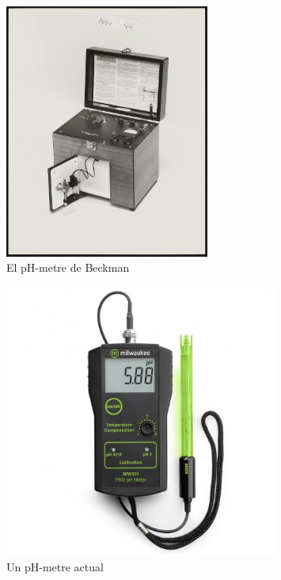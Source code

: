 \begin{minipage}[h]{0.5\textwidth}
  \begin{figure}[H]
  \centering
  \includegraphics[width=0.6\textwidth]{./Figures/modelbeckman.png}
  \caption{El pH-metre de Beckman}
  \label{fig:pH-metre}
  \end{figure}
\end{minipage}
\begin{minipage}[h]{0.5\textwidth}
  \begin{figure}[H]
  \centering
  \includegraphics[width=0.8\textwidth]{./Figures/pHmetre.png}
  \caption{Un pH-metre actual}
  \label{fig:pH-metre}
  \end{figure}
\end{minipage}

